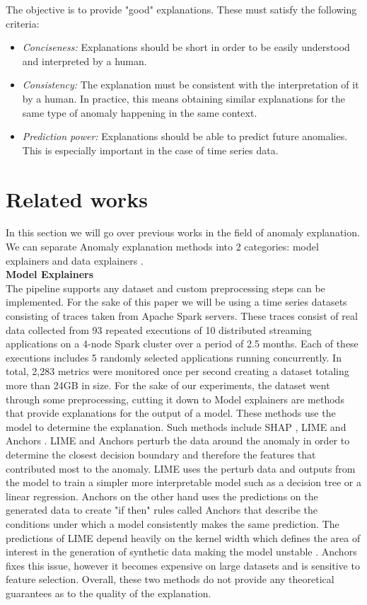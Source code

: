 \documentclass[oneside, a4paper, onecolumn, 11pt]{article}
\begin{document}
The objective is to provide "good" explanations. These must satisfy the following criteria: 
\begin{itemize}
  \item \textit{Conciseness:} Explanations should be short in order to be easily understood and interpreted by a human.
  \item \textit{Consistency:} The explanation must be consistent with the interpretation of it by a human. In practice, this means obtaining similar explanations for the same type of anomaly happening in the same context.
  \item \textit{Prediction power:} Explanations should be able to predict future anomalies. This is especially important in the case of time series data.
\end{itemize}
\section{Related works}
In this section we will go over previous works in the field of anomaly explanation. We can separate Anomaly explanation methods into 2 categories: model explainers and data explainers \cite{Li2023SurveyXAD} \cite{Panjei2022OutlierExplanations}.\\
\textbf{Model Explainers}\\The pipeline supports any dataset and custom preprocessing steps can be implemented. For the sake of this
paper we will be using a time series datasets consisting of traces taken from Apache Spark servers. These
traces consist of real data collected from 93 repeated executions of 10 distributed streaming applications on
a 4-node Spark cluster over a period of 2.5 months. Each of these executions includes 5 randomly selected
applications running concurrently. In total, 2,283 metrics were monitored once per second creating a dataset
totaling more than 24GB in size. For the sake of our experiments, the dataset went through some preprocessing,
cutting it down to
Model explainers are methods that provide explanations for the output of a model. These methods use the model to determine the explanation. Such methods include SHAP \cite{shap}, LIME \cite{lime} and Anchors \cite{anchors}. LIME and Anchors perturb the data around the anomaly in order to determine the closest decision boundary and therefore the features that contributed most to the anomaly. LIME uses the perturb data and outputs from the model to train a simpler more interpretable model such as a decision tree or a linear regression. Anchors on the other hand uses the predictions on the generated data to create "if then" rules called Anchors that describe the conditions under which a model consistently makes the same prediction. The predictions of LIME depend heavily on the kernel width which defines the area of interest in the generation of synthetic data making the model unstable \cite{optilime}. Anchors fixes this issue, however it becomes expensive on large datasets and is sensitive to feature selection. Overall, these two methods do not provide any theoretical guarantees as to the quality of the explanation.\\
\end{document}
